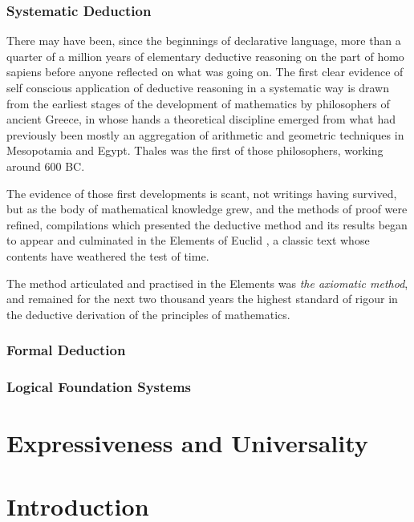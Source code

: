 \documentclass[10pt,titlepage]{book}
\begin{document}
\subsection{Systematic Deduction}

There may have been, since the beginnings of declarative language, more than a quarter of a million years of elementary deductive reasoning on the part of homo sapiens before anyone reflected on what was going on.
The first clear evidence of self conscious application of deductive reasoning in a systematic way is drawn from the earliest stages of the development of mathematics by philosophers of ancient Greece, in whose hands a theoretical discipline emerged from what had previously been mostly an aggregation of arithmetic and geometric techniques in Mesopotamia and Egypt.
Thales was the first of those philosophers, working around 600 BC.

The evidence of those first developments is scant, not writings having survived, but as the body of mathematical knowledge grew, and the methods of proof were refined, compilations which presented the deductive method and its results began to appear and culminated in the Elements of Euclid \cite{EuclidEL1}, a classic text whose contents have weathered the test of time.

The method articulated and practised in the Elements was \emph{the axiomatic method}, and remained for the next two thousand years the highest standard of rigour in the deductive derivation of the principles of mathematics.

\subsection{Formal Deduction}




\subsection{Logical Foundation Systems}




\chapter{Expressiveness and Universality}

\chapter{Introduction}
\end{document}

